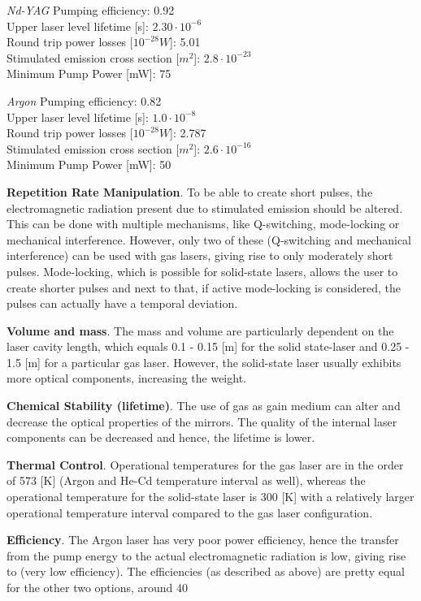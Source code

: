 \textit{Nd-YAG}
Pumping efficiency: 0.92\\
Upper \acs{laser} level lifetime [s]: $2.30\cdot10^{-6}$\\
Round trip power losses [$10^{-28} W$]: 5.01\\
Stimulated emission cross section [$m^{2}$]: $2.8\cdot10^{-23}$\\
Minimum Pump Power [mW]: 75

\textit{Argon}
Pumping efficiency: 0.82\\
Upper \acs{laser} level lifetime [s]: $1.0\cdot10^{-8}$\\
Round trip power losses [$10^{-28} W$]:  2.787\\
Stimulated emission cross section [$m^{2}$]: $2.6\cdot10^{-16}$\\
Minimum Pump Power [mW]: 50

\textbf{Repetition Rate Manipulation}. To be able to create short pulses, the electromagnetic radiation present due to stimulated emission should be altered. This can be done with multiple mechanisms, like Q-switching, mode-locking or mechanical interference. However, only two of these (Q-switching and mechanical interference) can be used with gas \acs{laser}s, giving rise to only moderately short pulses. Mode-locking, which is possible for solid-state \acs{laser}s, allows the user to create shorter pulses and next to that, if active mode-locking is considered, the pulses can actually have a temporal deviation. 
 
\textbf{Volume and mass}. 
The mass and volume are particularly dependent on the \acs{laser} cavity length, which equals 0.1 - 0.15 [m] for the solid state-laser and 0.25 - 1.5 [m] for a particular gas \acs{laser}. However, the solid-state \acs{laser} usually exhibits more optical components, increasing the weight.  

\textbf{Chemical Stability (lifetime)}. The use of gas as gain medium can alter and decrease the optical properties of the mirrors. The quality of the internal \acs{laser} components can be decreased and hence, the lifetime is lower.   

\textbf{Thermal Control}. Operational temperatures for the gas \acs{laser} are in the order of 573 [K] (Argon and He-Cd temperature interval as well), whereas the operational temperature for the solid-state \acs{laser} is 300 [K] with a relatively larger operational temperature interval compared to the gas \acs{laser} configuration.  

\textbf{Efficiency}. The Argon \acs{laser} has very poor power efficiency, hence the transfer from the pump energy to the actual electromagnetic radiation is low, giving rise to (very low efficiency). The efficiencies (as described as above) are pretty equal for the other two options, around 40%
 
